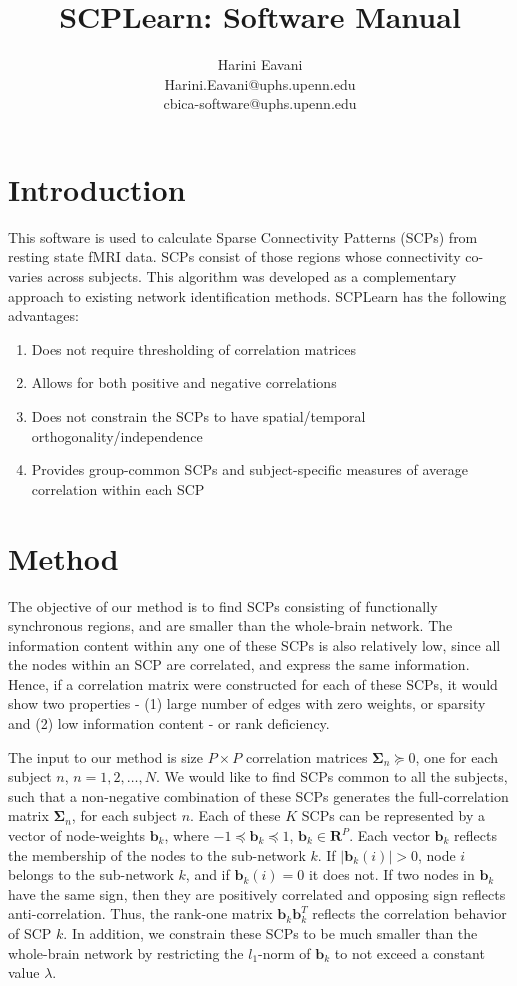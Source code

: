 \documentclass[12pt]{article}
\newcommand{\bb}{\mathbf{b}}
\newcommand{\bSigma}{\mathbf{\Sigma}}
\newcommand{\reals}{\mathbb{\mathbf{R}}}
\begin{document}
\title{SCPLearn: Software Manual}
\author{Harini Eavani \\ Harini.Eavani@uphs.upenn.edu \\ cbica-software@uphs.upenn.edu}
\maketitle

\section{Introduction}
This software is used to calculate Sparse Connectivity Patterns (SCPs) from resting state fMRI data. SCPs consist of those regions whose connectivity co-varies across subjects. This algorithm was developed as a complementary approach to existing network identification methods. SCPLearn has the following advantages:
\begin{enumerate}
\item Does not require thresholding of correlation matrices
\item Allows for both positive and negative correlations
\item Does not constrain the SCPs to have spatial/temporal orthogonality/independence
\item Provides group-common SCPs and subject-specific measures of average correlation within each SCP
\end{enumerate}

\section{Method}
 The objective of our method is to find SCPs consisting of functionally synchronous regions, and are smaller than the whole-brain network. The information content within any one of these SCPs is also relatively low, since all the nodes within an SCP are correlated, and express the same information. Hence, if a correlation matrix were constructed for each of these SCPs, it would show two properties - (1) large number of edges with zero weights, or sparsity and (2) low information content - or rank deficiency. 

The input to our method is size $P \times P$ correlation matrices $\bSigma_n \succeq 0 $, one for each subject $n$, $n = 1, 2, \ldots, N$. We would like to find SCPs common to all the subjects, such that a non-negative combination of these SCPs generates the full-correlation matrix  $\bSigma_n$, for each subject $n$. Each of these $K$ SCPs can be represented by a vector of node-weights $\bb_k$, where $ -1 \preceq \bb_k \preceq 1$, $\bb_k \in \reals^P$. Each vector $\bb_k$ reflects the membership of the nodes to the sub-network $k$.  If $\left|\bb_k (i) \right| > 0 $, node $i$ belongs to the sub-network $k$, and if $\bb_k (i) = 0 $ it does not. If two nodes in $\bb_k$ have the same sign, then they are positively correlated and opposing sign reflects anti-correlation. Thus, the rank-one matrix $\bb_k \bb_k^T$ reflects the correlation behavior of SCP $k$. In addition, we constrain these SCPs to be much smaller than the whole-brain network by restricting the $l_1$-norm of $\bb_k$ to not exceed a constant value $\lambda$. 	
\end{document}
